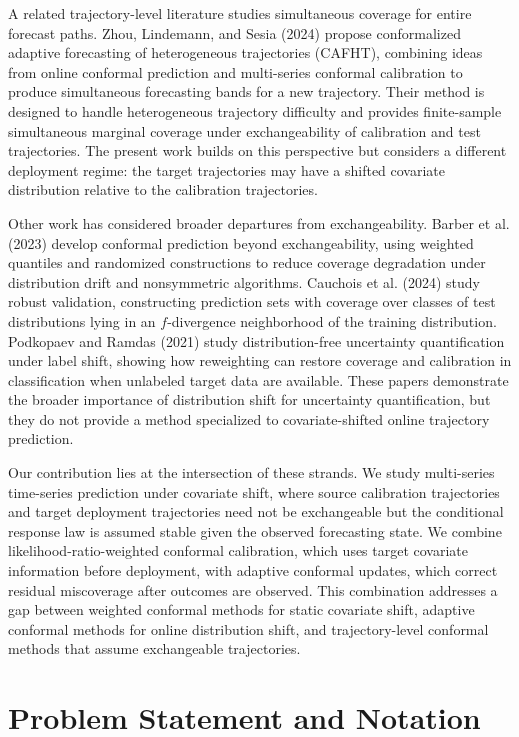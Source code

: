 \documentclass{article}
\numberwithin{equation}{section}
\begin{document}
A related trajectory-level literature studies simultaneous coverage for entire
forecast paths. Zhou, Lindemann, and Sesia (2024) propose conformalized adaptive
forecasting of heterogeneous trajectories (CAFHT), combining ideas from online
conformal prediction and multi-series conformal calibration to produce
simultaneous forecasting bands for a new trajectory. Their method is designed to
handle heterogeneous trajectory difficulty and provides finite-sample
simultaneous marginal coverage under exchangeability of calibration and test
trajectories. The present work builds on this perspective but considers a
different deployment regime: the target trajectories may have a shifted
covariate distribution relative to the calibration trajectories.

Other work has considered broader departures from exchangeability. Barber et al.
(2023) develop conformal prediction beyond exchangeability, using weighted
quantiles and randomized constructions to reduce coverage degradation under
distribution drift and nonsymmetric algorithms. Cauchois et al. (2024) study
robust validation, constructing prediction sets with coverage over classes of
test distributions lying in an \(f\)-divergence neighborhood of the training
distribution. Podkopaev and Ramdas (2021) study distribution-free uncertainty
quantification under label shift, showing how reweighting can restore coverage
and calibration in classification when unlabeled target data are available.
These papers demonstrate the broader importance of distribution shift for
uncertainty quantification, but they do not provide a method specialized to
covariate-shifted online trajectory prediction.

Our contribution lies at the intersection of these strands. We study
multi-series time-series prediction under covariate shift, where source
calibration trajectories and target deployment trajectories need not be
exchangeable but the conditional response law is assumed stable given the
observed forecasting state. We combine likelihood-ratio-weighted conformal
calibration, which uses target covariate information before deployment, with
adaptive conformal updates, which correct residual miscoverage after outcomes
are observed. This combination addresses a gap between weighted conformal
methods for static covariate shift, adaptive conformal methods for online
distribution shift, and trajectory-level conformal methods that assume
exchangeable trajectories.


\section{Problem Statement and Notation}
\end{document}
